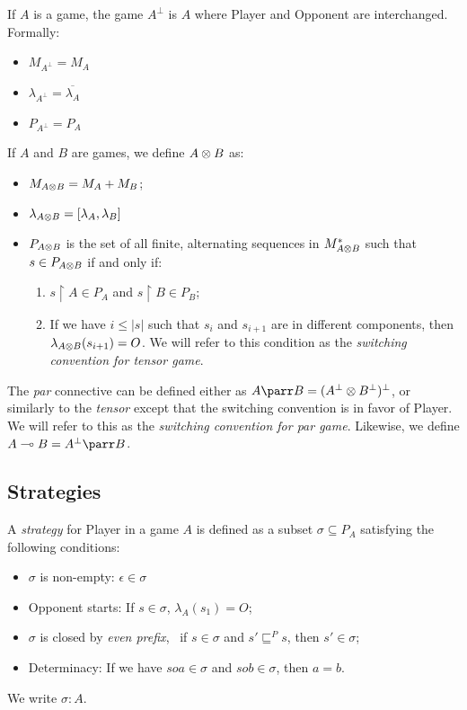 \begin{definition}
If $A$ is a game, the game $A^\bot$ is $A$ where Player and Opponent are interchanged. Formally:
\begin{itemize}
\item $M_{A^\bot} = M_A$
\item $\lambda_{A^\bot} = \overline{\lambda_A}$
\item $P_{A^\bot} = P_A$
\end{itemize}
\end{definition}

\begin{definition}[Tensor]
If $A$ and $B$ are games, we define $A \otimes B$ as:
\begin{itemize}
\item $M_{A\otimes B} = M_A + M_B$;
\item $\lambda_{A\otimes B} = [\lambda_A,\lambda_B]$
\item $P_{A\otimes B}$ is the set of all finite, alternating sequences in $M_{A\otimes B}^*$ such that $s\in P_{A\otimes B}$ if and only if:
  \begin{enumerate}
  \item $s\upharpoonright A\in P_A$ and $s \upharpoonright B \in P_B$;
  \item If we have $i\le |s|$ such that $ s_i$ and $s_{i+1}$ are in different components, then $\lambda_{A\otimes B}(s_{i+1}) = O$. We will refer to this condition as the \emph{switching convention for tensor game}.
  \end{enumerate}
\end{itemize}
\end{definition}

The \emph{par} connective can be defined either as
\(A\parr B = (A^\bot \tens B^\bot)^\bot\), or similarly to the
\emph{tensor} except that the switching convention is in favor of
Player. We will refer to this as the \emph{switching convention for par
game}. Likewise, we define \(A\limp B = A^\bot\parr B\).

\subsection{Strategies}\label{strategies}

\begin{definition}[Strategies]
A \emph{strategy} for Player in a game $A$ is defined as a subset $\sigma\subseteq P_A$ satisfying the following conditions:
\begin{itemize}
\item $\sigma$ is non-empty: $\epsilon\in \sigma$
\item Opponent starts: If $s\in \sigma$, $\lambda_A(s_1)=O$;
\item $\sigma$ is closed by \emph{even prefix}, \ie\ if $s\in \sigma$ and $s'\sqsubseteq^P s$, then $s'\in \sigma$;
\item Determinacy: If we have $soa\in \sigma$ and $sob\in \sigma$, then $a=b$.
\end{itemize}
We write $\sigma:A$.
\end{definition}

